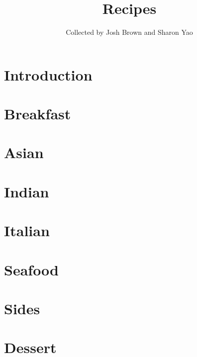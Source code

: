 \documentclass[twoside, 10pt]{book}
\title{\bf \Huge Recipes}
\author{Collected by Josh Brown and Sharon Yao}
\date{}
\begin{document}
\maketitle
\tableofcontents{}

\chapter*{Introduction}
    

\chapter{Breakfast}
    
    
    
    
    
    

\chapter{Asian}
    
    
    

\chapter{Indian}
    
    
    
    

\chapter{Italian}
    
    

\chapter{Seafood}
    
    
    
    
    
    
    

\chapter{Sides}
    
    
    

\chapter{Dessert}
    
    
    
    
    
    
    
\end{document}
